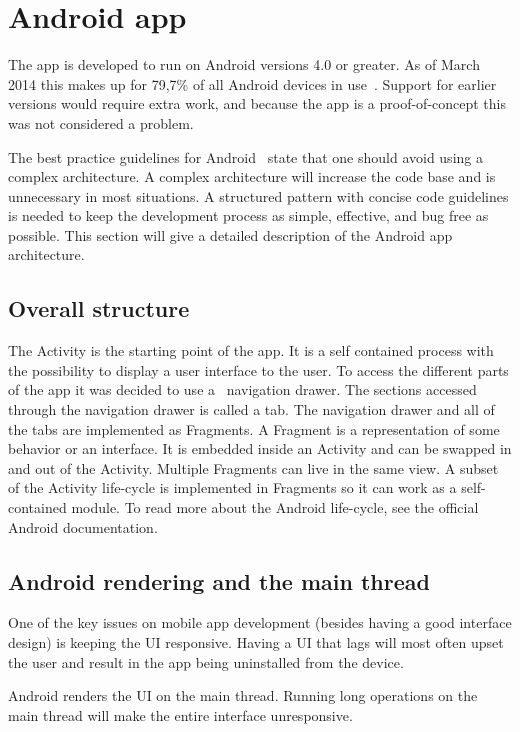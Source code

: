 \section{Android app}
\label{sec:arch_app}
The app is developed to run on Android versions 4.0 or greater. As of March 2014 this makes up for 79,7\% of all Android devices in use~\cite{AndroidDeviceFragmentation}.
Support for earlier versions would require extra work, and because the app is a proof-of-concept this was not considered a problem.

The best practice guidelines for Android~\cite{androidPracticePerformance} state that one should avoid using a complex architecture. A complex architecture will increase the code base and is unnecessary in most situations. A structured pattern with concise code guidelines is needed to keep the development process as simple, effective, and bug free as possible. This section will give a detailed description of the Android app architecture. 

\subsection{Overall structure}
The Activity is the starting point of the app. It is a self contained process with the possibility to display a user interface to the user. To access the different parts of the app it was decided to use a ~\gls{navigation drawer}. The sections accessed through the navigation drawer is called a tab. The navigation drawer and all of the tabs are implemented as Fragments. A Fragment is a representation of some behavior or an interface. It is embedded inside an Activity and can be swapped in and out of the Activity. Multiple Fragments can live in the same view. A subset of the Activity life-cycle is implemented in Fragments so it can work as a self-contained module. To read more about the Android life-cycle, see the official Android documentation.~\cite{androiddoc}

\subsection{Android rendering and the main thread}
One of the key issues on mobile app development (besides having a good interface design) is keeping the \gls{UI} responsive. Having a UI that lags will most often upset the user and result in the app being uninstalled from the device.

Android renders the UI on the main thread. Running long operations on the main thread will make the entire interface unresponsive.

